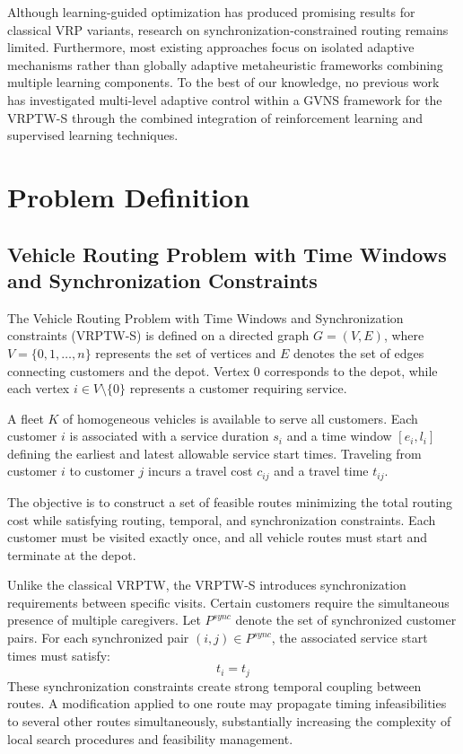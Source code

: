 \documentclass[preprint,12pt]{elsarticle}
\begin{document}
Although learning-guided optimization has produced promising results for classical VRP variants, research on synchronization-constrained routing remains limited. Furthermore, most existing approaches focus on isolated adaptive mechanisms rather than globally adaptive metaheuristic frameworks combining multiple learning components. To the best of our knowledge, no previous work has investigated multi-level adaptive control within a GVNS framework for the VRPTW-S through the combined integration of reinforcement learning and supervised learning techniques.
\section{Problem Definition} 
\label{sec:problem}

\subsection{Vehicle Routing Problem with Time Windows and Synchronization Constraints}
The Vehicle Routing Problem with Time Windows and Synchronization constraints (VRPTW-S) is defined on a directed graph $G=(V,E)$, where $V=\{0,1,\dots,n\}$ represents the set of vertices and $E$ denotes the set of edges connecting customers and the depot. Vertex $0$ corresponds to the depot, while each vertex $i \in V \setminus \{0\}$ represents a customer requiring service.

A fleet $K$ of homogeneous vehicles is available to serve all customers. Each customer $i$ is associated with a service duration $s_i$ and a time window $[e_i,l_i]$ defining the earliest and latest allowable service start times. Traveling from customer $i$ to customer $j$ incurs a travel cost $c_{ij}$ and a travel time $t_{ij}$.

The objective is to construct a set of feasible routes minimizing the total routing cost while satisfying routing, temporal, and synchronization constraints. Each customer must be visited exactly once, and all vehicle routes must start and terminate at the depot.

Unlike the classical VRPTW, the VRPTW-S introduces synchronization requirements between specific visits. Certain customers require the simultaneous presence of multiple caregivers. Let $P^{sync}$ denote the set of synchronized customer pairs. For each synchronized pair $(i,j)\in P^{sync}$, the associated service start times must satisfy:
\[ t_i = t_j \]
These synchronization constraints create strong temporal coupling between routes. A modification applied to one route may propagate timing infeasibilities to several other routes simultaneously, substantially increasing the complexity of local search procedures and feasibility management.
\end{document}
